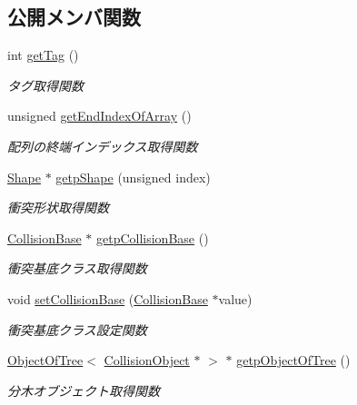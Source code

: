\subsection*{公開メンバ関数}
\begin{DoxyCompactItemize}
\item 
int \mbox{\hyperlink{class_collision_object_a0a34797b95ae9bc9908f95ed51caffbb}{get\+Tag}} ()
\begin{DoxyCompactList}\small\item\em タグ取得関数 \end{DoxyCompactList}\item 
unsigned \mbox{\hyperlink{class_collision_object_ab010df9c5972cd7d3701651841f987f0}{get\+End\+Index\+Of\+Array}} ()
\begin{DoxyCompactList}\small\item\em 配列の終端インデックス取得関数 \end{DoxyCompactList}\item 
\mbox{\hyperlink{class_collision_object_1_1_shape}{Shape}} $\ast$ \mbox{\hyperlink{class_collision_object_ab3531b5579d3759c67a38e1485ace2e2}{getp\+Shape}} (unsigned index)
\begin{DoxyCompactList}\small\item\em 衝突形状取得関数 \end{DoxyCompactList}\item 
\mbox{\hyperlink{class_collision_base}{Collision\+Base}} $\ast$ \mbox{\hyperlink{class_collision_object_abefc470a5608429eb208d46ba097f01e}{getp\+Collision\+Base}} ()
\begin{DoxyCompactList}\small\item\em 衝突基底クラス取得関数 \end{DoxyCompactList}\item 
void \mbox{\hyperlink{class_collision_object_aa2479b3ce56f1d1a784c86f390fa2e74}{set\+Collision\+Base}} (\mbox{\hyperlink{class_collision_base}{Collision\+Base}} $\ast$value)
\begin{DoxyCompactList}\small\item\em 衝突基底クラス設定関数 \end{DoxyCompactList}\item 
\mbox{\hyperlink{class_object_of_tree}{Object\+Of\+Tree}}$<$ \mbox{\hyperlink{class_collision_object}{Collision\+Object}} $\ast$ $>$ $\ast$ \mbox{\hyperlink{class_collision_object_a37388d7bcb131af17fe31be8394d1c10}{getp\+Object\+Of\+Tree}} ()
\begin{DoxyCompactList}\small\item\em 分木オブジェクト取得関数 \end{DoxyCompactList}\item 

\end{DoxyCompactItemize}
